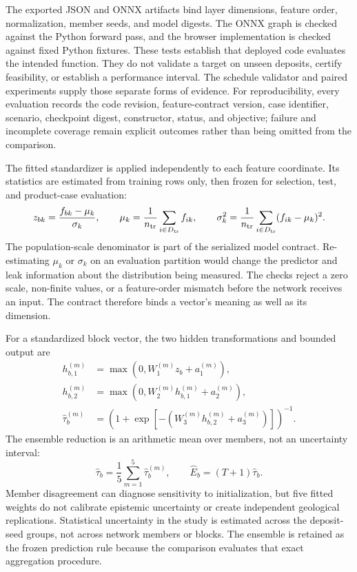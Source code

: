 \documentclass[11pt]{article}
\begin{document}
The exported JSON and ONNX artifacts bind layer dimensions, feature order, normalization, member seeds, and model digests. The ONNX graph is checked against the Python forward pass, and the browser implementation is checked against fixed Python fixtures. These tests establish that deployed code evaluates the intended function. They do not validate a target on unseen deposits, certify feasibility, or establish a performance interval. The schedule validator and paired experiments supply those separate forms of evidence. For reproducibility, every evaluation records the code revision, feature-contract version, case identifier, scenario, checkpoint digest, constructor, status, and objective; failure and incomplete coverage remain explicit outcomes rather than being omitted from the comparison.

The fitted standardizer is applied independently to each feature coordinate. Its statistics are estimated from training rows only, then frozen for selection, test, and product-case evaluation:
\begin{equation}
z_{bk}=\frac{f_{bk}-\mu_k}{\sigma_k},\qquad
\mu_k=\frac{1}{n_{\rm tr}}\sum_{i\in D_{\rm tr}}f_{ik},\qquad
\sigma_k^2=\frac{1}{n_{\rm tr}}\sum_{i\in D_{\rm tr}}(f_{ik}-\mu_k)^2.
\label{eq:train-standardization}
\end{equation}
The population-scale denominator is part of the serialized model contract. Re-estimating $\mu_k$ or $\sigma_k$ on an evaluation partition would change the predictor and leak information about the distribution being measured. The checks reject a zero scale, non-finite values, or a feature-order mismatch before the network receives an input. The contract therefore binds a vector's meaning as well as its dimension.

For a standardized block vector, the two hidden transformations and bounded output are
\begin{equation}
\begin{aligned}
h^{(m)}_{b,1}&=\max(0,W^{(m)}_1z_b+a^{(m)}_1),\\
h^{(m)}_{b,2}&=\max(0,W^{(m)}_2h^{(m)}_{b,1}+a^{(m)}_2),\\
\hat\tau^{(m)}_b&=\left(1+\exp[-(W^{(m)}_3h^{(m)}_{b,2}+a^{(m)}_3)]\right)^{-1}.
\end{aligned}
\label{eq:member-forward}
\end{equation}
The ensemble reduction is an arithmetic mean over members, not an uncertainty interval:
\begin{equation}
\hat\tau_b=\frac{1}{5}\sum_{m=1}^{5}\hat\tau^{(m)}_b,\qquad
\hat E_b=(T+1)\hat\tau_b.
\label{eq:ensemble-output}
\end{equation}
Member disagreement can diagnose sensitivity to initialization, but five fitted weights do not calibrate epistemic uncertainty or create independent geological replications. Statistical uncertainty in the study is estimated across the deposit-seed groups, not across network members or blocks. The ensemble is retained as the frozen prediction rule because the comparison evaluates that exact aggregation procedure.
\end{document}
